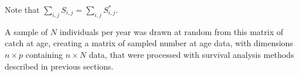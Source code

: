 Note that $\sum_{i,j} S_{i,j} = \sum_{i,j} S^{*}_{i,j}$.

A sample of $N$ individuals per year was drawn at random from this matrix of catch at age, creating a matrix of sampled number at age data, with dimensions $n \times p$ containing $n \times N$ data, that were processed with survival analysis methods described in previous sections. %
